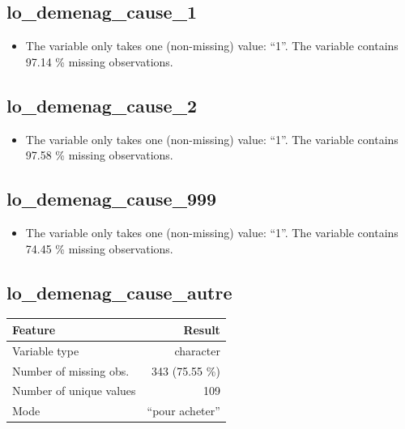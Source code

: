 \documentclass[
  letterpaper,
  DIV=11,
  numbers=noendperiod]{scrartcl}
\providecommand{\tightlist}{%
  \setlength{\itemsep}{0pt}\setlength{\parskip}{0pt}}
\begin{document}
\emini

\fullline

\subsection{lo\_demenag\_cause\_1}\label{lo_demenag_cause_1}

\begin{itemize}
\tightlist
\item
  The variable only takes one (non-missing) value: ``1''. The variable
  contains 97.14 \% missing observations.
\end{itemize}

\fullline

\subsection{lo\_demenag\_cause\_2}\label{lo_demenag_cause_2}

\begin{itemize}
\tightlist
\item
  The variable only takes one (non-missing) value: ``1''. The variable
  contains 97.58 \% missing observations.
\end{itemize}

\fullline

\subsection{lo\_demenag\_cause\_999}\label{lo_demenag_cause_999}

\begin{itemize}
\tightlist
\item
  The variable only takes one (non-missing) value: ``1''. The variable
  contains 74.45 \% missing observations.
\end{itemize}

\fullline

\subsection{lo\_demenag\_cause\_autre}\label{lo_demenag_cause_autre}

\bminione

\begin{longtable}[]{@{}lr@{}}
\toprule\noalign{}
Feature & Result \\
\midrule\noalign{}
\endhead
\bottomrule\noalign{}
\endlastfoot
Variable type & character \\
Number of missing obs. & 343 (75.55 \%) \\
Number of unique values & 109 \\
Mode & ``pour acheter'' \\
\end{longtable}
\end{document}
